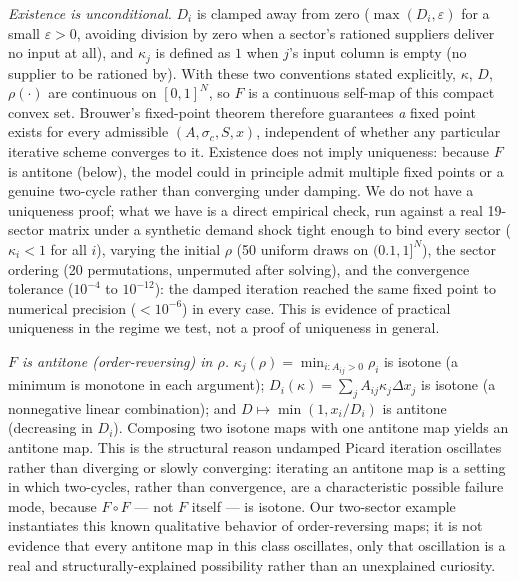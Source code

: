 \documentclass[11pt]{article}
\begin{document}
\emph{Existence is unconditional.} $D_i$ is clamped away from zero
($\max(D_i,\varepsilon)$ for a small $\varepsilon>0$, avoiding division
by zero when a sector's rationed suppliers deliver no input at all), and
$\kappa_j$ is defined as $1$ when $j$'s input column is empty (no
supplier to be rationed by). With these two conventions stated
explicitly, $\kappa$, $D$, $\rho(\cdot)$ are continuous on $[0,1]^N$, so
$F$ is a continuous self-map of this compact convex set. Brouwer's
fixed-point theorem therefore guarantees \emph{a} fixed point exists for
every admissible $(A,\sigma_c,S,x)$, independent of whether any
particular iterative scheme converges to it. Existence does not imply
uniqueness: because $F$ is antitone (below), the model could in
principle admit multiple fixed points or a genuine two-cycle rather than
converging under damping. We do not have a uniqueness proof; what we
have is a direct empirical check, run against a real 19-sector matrix
under a synthetic demand shock tight enough to bind every sector
($\kappa_i<1$ for all $i$), varying the initial $\rho$ (50 uniform draws
on $(0.1,1]^N$), the sector ordering (20 permutations, unpermuted after
solving), and the convergence tolerance ($10^{-4}$ to $10^{-12}$): the
damped iteration reached the same fixed point to numerical precision
($<10^{-6}$) in every case. This is evidence of practical uniqueness in
the regime we test, not a proof of uniqueness in general.

\emph{$F$ is antitone (order-reversing) in $\rho$.} $\kappa_j(\rho)=
\min_{i:A_{ij}>0}\rho_i$ is isotone (a minimum is monotone in each
argument); $D_i(\kappa)=\sum_jA_{ij}\kappa_j\Delta x_j$ is isotone
(a nonnegative linear combination); and $D\mapsto\min(1,x_i/D_i)$ is
antitone (decreasing in $D_i$). Composing two isotone maps with one
antitone map yields an antitone map. This is the structural reason
undamped Picard iteration oscillates rather than diverging or slowly
converging: iterating an antitone map is a setting in which two-cycles,
rather than convergence, are a characteristic possible failure mode,
because $F\circ F$ --- not $F$ itself --- is isotone. Our two-sector
example instantiates this known qualitative behavior of order-reversing
maps; it is not evidence that every antitone map in this class
oscillates, only that oscillation is a real and structurally-explained
possibility rather than an unexplained curiosity.
\end{document}
